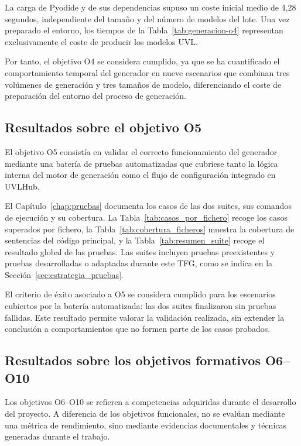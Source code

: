 La carga de Pyodide y de sus dependencias supuso un coste inicial medio de
4,28 segundos, independiente del tamaño y del número de modelos del lote. Una
vez preparado el entorno, los tiempos de la
Tabla~\ref{tab:generacion-o4} representan exclusivamente el coste de producir
los modelos UVL.

Por tanto, el objetivo O4 se considera cumplido, ya que se ha cuantificado el
comportamiento temporal del generador en nueve escenarios que combinan tres
volúmenes de generación y tres tamaños de modelo, diferenciando el coste de
preparación del entorno del proceso de generación.

\subsection{Resultados sobre el objetivo O5}
\label{subsec:resultados_o5}

El objetivo O5 consistía en validar el correcto funcionamiento del generador
mediante una batería de pruebas automatizadas que cubriese tanto la lógica
interna del motor de generación como el flujo de configuración integrado en
UVLHub.

El Capítulo~\ref{chap:pruebas} documenta los casos de las dos suites, sus
comandos de ejecución y su cobertura. La Tabla~\ref{tab:casos_por_fichero} recoge los casos superados por fichero, la Tabla~\ref{tab:cobertura_ficheros} muestra la cobertura de sentencias del código principal, y la Tabla~\ref{tab:resumen_suite} recoge
el resultado global de las pruebas. 
Las suites incluyen pruebas preexistentes y pruebas desarrolladas o adaptadas durante este
TFG, como se indica en la Sección~\ref{sec:estrategia_pruebas}.

El criterio de éxito asociado a O5 se considera cumplido para los escenarios
cubiertos por la batería automatizada: las dos suites finalizaron sin pruebas
fallidas. Este resultado permite valorar la validación realizada, sin extender
la conclusión a comportamientos que no formen parte de los casos probados.

\subsection{Resultados sobre los objetivos formativos O6--O10}
\label{subsec:resultados_objetivos_formativos}

Los objetivos O6--O10 se refieren a competencias adquiridas durante el
desarrollo del proyecto. A diferencia de los objetivos funcionales, no se
evalúan mediante una métrica de rendimiento, sino mediante evidencias
documentales y técnicas generadas durante el trabajo.

